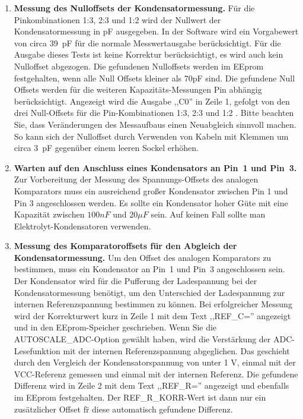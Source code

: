 \begin{enumerate}
\item {\bf Messung des Nulloffsets der Kondensatormessung.}
Für die Pinkombinationen 1:3, 2:3 und 1:2 wird der Nullwert der Kondensatormessung in pF ausgegeben.
In der Software wird ein Vorgabewert von circa 39~pF für die normale Messwertausgabe berücksichtigt.
Für die Ausgabe dieses Tests ist keine Korrektur berücksichtigt, es wird auch kein Nulloffset abgezogen.
Die gefundenen Nulloffsets werden im EEprom festgehalten, wenn alle Null Offsets kleiner als 70pF sind.
Die gefundene Null Offsets werden für die weiteren Kapazitäts-Messungen Pin abhängig berücksichtigt.
Angezeigt wird  die Ausgabe ,,C0''  in Zeile 1, gefolgt von den drei Null-Offsets für
die Pin-Kombinationen 1:3, 2:3 und 1:2 .
Bitte beachten Sie, dass Veränderungen des Messaufbaus einen Neuabgleich sinnvoll machen.
So kann sich der Nulloffset durch Verwenden von Kabeln mit Klemmen um circa 3~pF gegenüber einem leeren
Sockel erhöhen.

\item {\bf Warten auf den Anschluss eines Kondensators an Pin~1 und Pin~3.}
Zur Vorbereitung der Messung des Spannungs-Offsets des analogen Komparators muss ein ausreichend großer
Kondensator zwischen Pin 1 und Pin 3 angeschlossen werden.
Es sollte ein Kondensator hoher Güte mit eine Kapazität zwischen \(100 nF\) und \(20 \mu F\) sein. 
Auf keinen Fall sollte man Elektrolyt-Kondensatoren verwenden.


\item {\bf Messung des Komparatoroffsets für den Abgleich der Kondensatormessung.}
Um den Offset des analogen Komparators zu bestimmen, muss ein Kondensator an Pin~1 und Pin~3 angeschlossen sein.
Der Kondensator wird für die Pufferung der Ladespannung bei der Kondensatormessung benötigt, um den Unterschied der 
Ladespannung zur internen Referenzspannung bestimmen zu können.
Bei erfolgreicher Messung wird der Korrekturwert kurz in Zeile 1 mit dem Text ,,REF\_C='' angezeigt und in den EEprom-Speicher geschrieben.
Wenn Sie die AUTOSCALE\_ADC-Option gewählt haben, wird die Verstärkung der ADC-Lesefunktion mit der
internen Referenzspannung abgeglichen. Das geschieht durch den Vergleich der Kondensatorspannung von unter 1 V, einmal mit
der VCC-Referenz gemessen und einmal mit der internen Referenz.
Die gefundene Differenz wird in Zeile 2 mit dem Text ,,REF\_R='' angezeigt und ebenfalls im EEprom festgehalten.
Der REF\_R\_KORR-Wert ist dann nur ein zusätzlicher Offset f\"r diese automatisch gefundene Differenz.

\end{enumerate}

